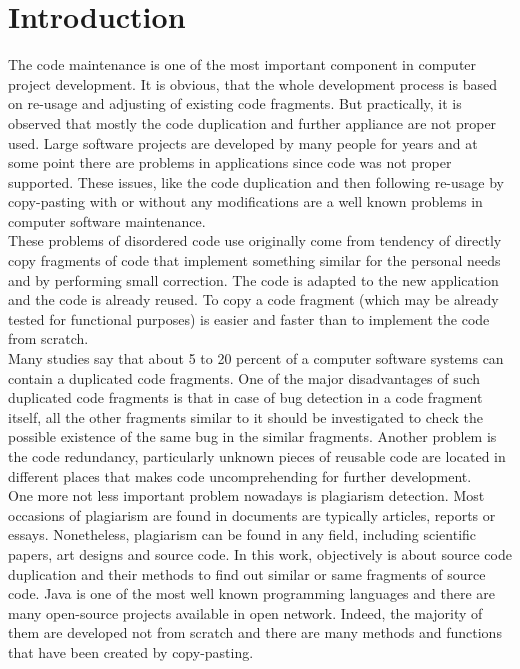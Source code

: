 \documentclass{report}
\begin{document}
\chapter{Introduction}
The code maintenance is one of the most important component in computer project development. It is obvious, that the whole development process is based on re-usage and adjusting of existing code fragments. But practically, it is observed that mostly the code duplication and further appliance are not proper used. Large software projects are developed by many people for years and at some point there are problems in applications since code was not proper supported. These issues, like the code duplication and then following re-usage by copy-pasting with or without any modifications are a well known problems in computer software maintenance.
\\
These problems of disordered code use originally come from tendency of directly copy fragments of code that implement something similar for the personal needs and by performing small correction. The code is adapted to the new application and the code is already reused. To copy a code fragment (which may be already tested for functional purposes) is easier and faster than to implement the code from scratch.
\\
Many studies say that about 5 to 20 percent of a computer software systems can contain a duplicated code fragments. One of the major disadvantages of such duplicated code fragments is that in case of  bug detection in a code fragment itself, all the other fragments similar to it should be investigated to check the possible existence of the same bug in the similar fragments. Another problem is the code redundancy, particularly unknown pieces of reusable code are located in different places that makes code uncomprehending for further development. 
\\
One more not less important problem nowadays is plagiarism detection. Most occasions of plagiarism are found in documents are typically articles, reports or essays. Nonetheless, plagiarism can be found in any field, including scientific papers, art designs and source code. In this work, objectively is about source code duplication and their methods to find out similar or same fragments of source code. Java is one of the most well known programming languages 
and there are many open-source projects available in open network. Indeed, the majority of them are developed not from scratch and there are many methods and functions that have been created by copy-pasting.
\\
\end{document}
